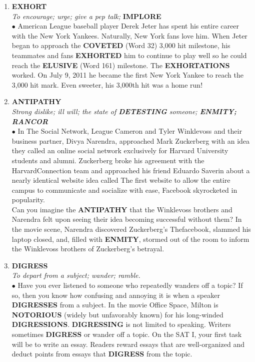 \documentclass{book}
\begin{document}
\begin{enumerate}
\item \textbf{EXHORT}\\
\textit{ To encourage; urge; give a pep talk;}\textbf{ IMPLORE}\\

$\bullet$ American League baseball player Derek Jeter has spent his entire career with the New York Yankees. Naturally, New York fans love him. When Jeter began to approach the \textbf{COVETED} (Word 32) 3,000 hit milestone, his teammates and fans \textbf{EXHORTED} him to continue to play well so he could reach the \textbf{ELUSIVE} (Word 161) milestone. The \textbf{EXHORTATIONS} worked. On July 9, 2011 he became the first New York Yankee to reach the 3,000 hit mark. Even sweeter, his 3,000th hit was a home run! 

\item \textbf{ANTIPATHY}\\
\textit{Strong dislike; ill will; the state of \textbf{DETESTING} someone; \textbf{ENMITY; RANCOR} }\\

$\bullet$ In The Social Network, League Cameron and Tyler Winklevoss and their business partner, Divya Narendra, approached Mark Zuckerberg with an idea they called  an online social network exclusively for Harvard University students and alumni. Zuckerberg broke his agreement with the HarvardConnection team and approached his friend Eduardo Saverin about a nearly identical website idea called  The first website to allow the entire campus to communicate and socialize with ease, Facebook skyrocketed in popularity.\\

Can you imagine the \textbf{ANTIPATHY} that the Winklevoss brothers and Narendra felt upon seeing their idea becoming successful without them? In the movie scene, Narendra discovered Zuckerberg's Thefacebook, slammed his laptop closed, and, filled with \textbf{ENMITY}, stormed out of the room to inform the Winklevoss brothers of Zuckerberg's betrayal.

\item \textbf{DIGRESS}\\
\textit{To depart from a subject; wander; ramble.}\\

$\bullet$ Have you ever listened to someone who repeatedly wanders off a topic? If so, then you know how confusing and annoying it is when a speaker \textbf{DIGRESSES} from a subject. In the movie Office Space, Milton is \textbf{NOTORIOUS} (widely but unfavorably known) for his long-winded \textbf{DIGRESSIONS}. \textbf{DIGRESSING} is not limited to speaking. Writers sometimes \textbf{DIGRESS} or wander off a topic. On the SAT I, your first task will be to write an essay. Readers reward essays that are well-organized and deduct points from essays that \textbf{DIGRESS} from the topic.


\end{enumerate}
\end{document}
